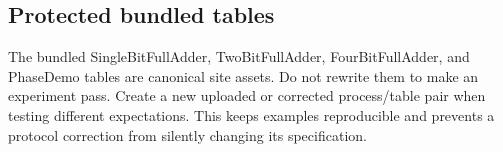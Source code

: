 \subsection{Protected bundled tables}

The bundled SingleBitFullAdder, TwoBitFullAdder, FourBitFullAdder, and PhaseDemo
tables are canonical site assets. Do not rewrite them to make an experiment
pass. Create a new uploaded or corrected process/table pair when testing
different expectations. This keeps examples reproducible and prevents a
protocol correction from silently changing its specification.

